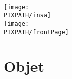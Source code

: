 
\maketitle

\thispagestyle{empty}

\hfill\\
\vfill


\begin{center}
    \texttt{[image: \\PIXPATH/insa]}\hfill\\
    \texttt{[image: \\PIXPATH/frontPage]}
\end{center}

\section*{Objet}
\Object
